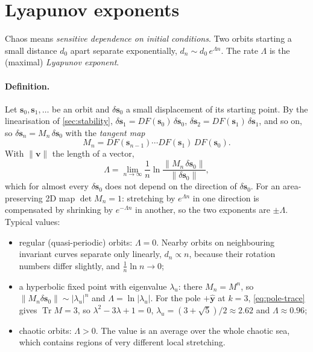 \documentclass[11pt,a4paper]{article}
\newcommand{\vs}{\bm{s}}
\newcommand{\Tr}{\operatorname{Tr}}
\begin{document}
\section{Lyapunov exponents}\label{sec:lyapunov}

Chaos means \emph{sensitive dependence on initial conditions}. Two orbits starting a small distance $d_0$ apart
separate exponentially, $d_n \sim d_0\, e^{\Lambda n}$. The rate $\Lambda$ is the (maximal) \emph{Lyapunov exponent}.

\paragraph{Definition.} Let $\vs_0, \vs_1, \dots$ be an orbit and $\delta\vs_0$ a small displacement of its starting
point. By the linearisation of \cref{sec:stability}, $\delta\vs_1 = DF(\vs_0)\,\delta\vs_0$, $\delta\vs_2 =
DF(\vs_1)\,\delta\vs_1$, and so on, so $\delta\vs_n = M_n\,\delta\vs_0$ with the \emph{tangent map}
\begin{equation*}
  M_n = DF(\vs_{n-1})\cdots DF(\vs_1)\,DF(\vs_0).
\end{equation*}
With $\|\bm v\|$ the length of a vector,
\begin{equation}\label{eq:lyapunov}
  \Lambda = \lim_{n\to\infty} \frac{1}{n}\ln\frac{\|M_n\,\delta\vs_0\|}{\|\delta\vs_0\|} ,
\end{equation}
which for almost every $\delta\vs_0$ does not depend on the direction of $\delta\vs_0$. For an area-preserving 2D map
$\det M_n = 1$: stretching by $e^{\Lambda n}$ in one direction is compensated by shrinking by $e^{-\Lambda n}$ in
another, so the two exponents are $\pm\Lambda$. Typical values:
\begin{itemize}
  \item regular (quasi-periodic) orbits: $\Lambda = 0$. Nearby orbits on neighbouring invariant curves separate only
  linearly, $d_n \propto n$, because their rotation numbers differ slightly, and $\frac1n\ln n \to 0$;
  \item a hyperbolic fixed point with eigenvalue $\lambda_u$: there $M_n = M^n$, so $\|M_n\delta\vs_0\| \sim
  |\lambda_u|^n$ and $\Lambda = \ln|\lambda_u|$. For the pole $+\hat{\bm y}$ at $k=3$, \eqref{eq:pole-trace} gives
  $\Tr M = 3$, so $\lambda^2 - 3\lambda + 1 = 0$, $\lambda_u = (3+\sqrt5)/2 \approx 2.62$ and $\Lambda \approx 0.96$;
  \item chaotic orbits: $\Lambda > 0$. The value is an average over the whole chaotic sea, which contains regions of
  very different local stretching.
\end{itemize}
\end{document}
